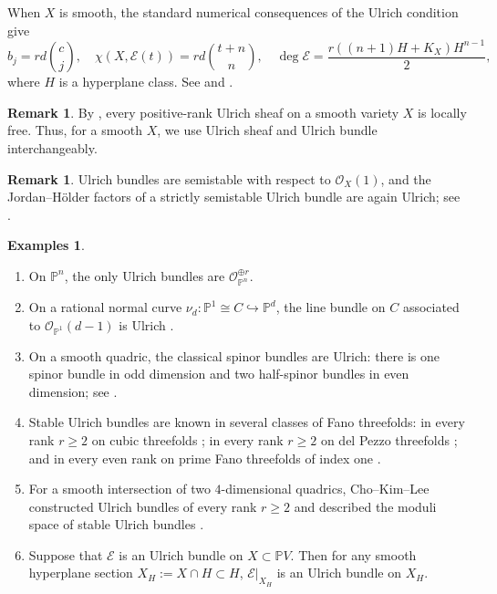 \documentclass[12pt, letterpaper]{amsart}
\theoremstyle{definition}
\newtheorem{examples}[theorem]{Examples}
\newtheorem{remark}[theorem]{Remark}
\newcommand{\PP}{\mathbb{P} }
\newcommand{\cE}{\mathcal{E} }
\newcommand{\cO}{\mathcal{O} }
\begin{document}
When \(X\) is smooth, the standard numerical consequences of the Ulrich condition give
\begin{equation}\label{eqn:Ulrichnumeric}
b_j=rd\binom{c}{j}, \quad\chi(X,\cE(t))=rd\binom{t+n}{n}, \quad \deg \cE = \frac{r((n+1)H + K_X)H^{n-1}}{2},
\end{equation}
where \(H\) is a hyperplane class. See \cite[Corollary~2.2]{ES03} and \cite[Proposition~3.2.5, Corollary~3.2.10]{CMRPL21}.

\begin{remark}
By \cite[\S2.1]{CMRPL21}, every positive-rank Ulrich sheaf on a smooth variety \(X\) is locally free. Thus, for a smooth \(X\), we use Ulrich sheaf and Ulrich bundle interchangeably.
\end{remark}

\begin{remark}
Ulrich bundles are semistable with respect to \(\cO_X(1)\), and the Jordan--H\"older factors of a strictly semistable Ulrich bundle are again Ulrich; see \cite[Proposition~3.3.14]{CMRPL21}.
\end{remark}

\begin{examples}
\begin{enumerate}[label=\textup{(\arabic*)}]
  \item On \(\PP^n\), the only Ulrich bundles are \(\cO_{\PP^n}^{\oplus r}\).
  \item On a rational normal curve \(\nu_d:\mathbb{P}^1 \cong C\hookrightarrow\mathbb{P}^d\), the line bundle on \(C\) associated to \(\cO_{\mathbb{P}^1}(d-1)\) is Ulrich \cite[\S4.1.1]{Cos17}.
  \item On a smooth quadric, the classical spinor bundles are Ulrich: there is one spinor bundle in odd dimension and two half-spinor bundles in even dimension; see \cite{Ott88}.
  \item Stable Ulrich bundles are known in several classes of Fano threefolds: in every rank \(r \ge 2\) on cubic threefolds \cite{LMS15}; in every rank \(r\ge2\) on del Pezzo threefolds \cite{CFK23}; and in every even rank on prime Fano threefolds of index one \cite{CFK24}.
  \item For a smooth intersection of two \(4\)-dimensional quadrics, Cho--Kim--Lee constructed Ulrich bundles of every rank \(r\ge2\) and described the moduli space of stable Ulrich bundles \cite{CKL21}.
  \item Suppose that \(\cE\) is an Ulrich bundle on \(X \subset \PP V\). Then for any smooth hyperplane section \(X_H := X \cap H \subset H\), \(\cE|_{X_H}\) is an Ulrich bundle on \(X_H\).
\end{enumerate}
\end{examples}
\end{document}
